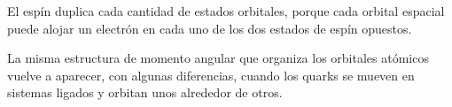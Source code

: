 El espín duplica cada cantidad de estados orbitales, porque cada orbital espacial puede alojar un electrón en cada uno de los dos estados de espín opuestos.

\begin{classroomqa}
\end{classroomqa}

La misma estructura de momento angular que organiza los orbitales atómicos vuelve a aparecer, con algunas diferencias, cuando los quarks se mueven en sistemas ligados y orbitan unos alrededor de otros.
